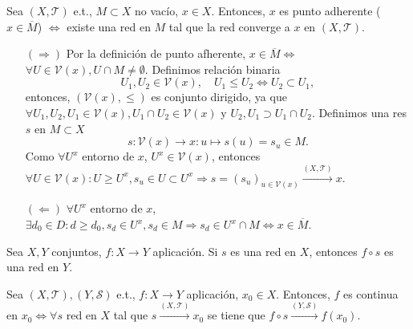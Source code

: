 \begin{prop}
  Sea $( X, \mathcal{T} )$ e.t., $M \subset X$ no vacío, $x \in X$. Entonces, $x$ es punto adherente ($x \in \overline{M}$) $\Leftrightarrow$ existe una red en $M$ tal que la red converge a $x$ en $( X, \mathcal{T} )$.
\end{prop} 

\begin{dem}
  \begin{enumerate}[label=(\roman*)]
    \item []
    \item [$(\Rightarrow)$] Por la definición de punto afherente, $x \in \overline{M} \Leftrightarrow$ $\forall U \in \mathcal{V}(x), U \cap M \neq \emptyset$. Definimos relación binaria
      \[ 
        U_{1}, U_{2} \in \mathcal{V}(x), \quad U_{1} \leq U_{2} \Leftrightarrow U_{2} \subset U_{1},
      \]
      entonces, $ (\mathcal{V}(x), \leq)$ es conjunto dirigido, ya que $\forall U_{1}, U_{2}, U_{1} \in \mathcal{V}(x), U_{1} \cap U_{2} \in \mathcal{V}(x)$ y $U_{2}, U_{1} \supset U_{1} \cap U_{2}$. Definimos una res $s$ en $M \subset X$
      \[ 
        s : \mathcal{V}(x) \to x : u \mapsto s(u) = s_{u} \in M.
      \] 
      Como $\forall U^{x}$ entorno de $x$, $U^{x} \in \mathcal{V}(x)$, entonces $\forall U \in \mathcal{V}(x) : U \geq U^{x}, s_{u} \in U \subset U^{x} \Rightarrow s = (s_{u})_{u \in \mathcal{V}(x)} \xrightarrow[]{ ( X, \mathcal{T} ) } x$.
    \item [$(\Leftarrow)$] $\forall U^{x} $ entorno de $x$, $\exists d_{0} \in D : d \geq d_{0}, s_{d} \in U^{x}, s_{d} \in M \Rightarrow s_{d} \in U^{x} \cap M \Leftrightarrow x \in \overline{M}$.
  \end{enumerate}
\end{dem}

\begin{obs}
  Sea $X, Y$ conjuntos, $f : X \to Y$ aplicación. Si $s$ es una red en $X$, entonces $f \circ s$ es una red en $Y$.
\end{obs}

\begin{prop}
  Sea $( X, \mathcal{T} ), ( Y, \mathcal{S} )$ e.t., $f : X \to Y$ aplicación, $x_{0} \in X$. Entonces, $f$ es continua en $x_{0} \Leftrightarrow \forall s$ red en $X$ tal que $s \xrightarrow[]{ ( X, \mathcal{T} ) } x_{0}$ se tiene que $f \circ s \xrightarrow[]{ ( Y, \mathcal{S} ) } f(x_{0})$.
\end{prop}

